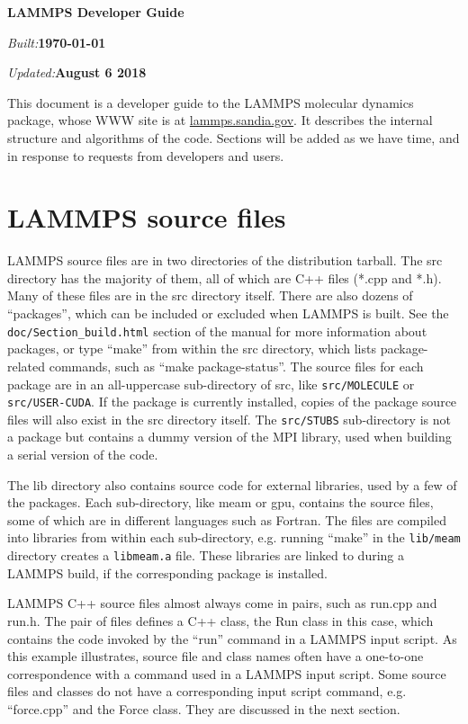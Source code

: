 \documentclass{article}
\newcommand{\path}[1]{{\color{gray}\texttt{#1}}}
\begin{document}
\centerline{\Large \bf LAMMPS Developer Guide}
\centerline{\emph{Built:}\bf \today}
\centerline{\emph{Updated:}\bf August 6 2018}

\vspace{0.5in}

This document is a developer guide to the LAMMPS molecular dynamics
package, whose WWW site is at \url{lammps.sandia.gov}.  It describes the
internal structure and algorithms of the code.  Sections will be added
as we have time, and in response to requests from developers and
users.

\tableofcontents
\renewcommand\listoflistingscaption{List of source codes}
\listoflistings

\pagebreak
\section{LAMMPS source files}

LAMMPS source files are in two directories of the distribution
tarball.  The src directory has the majority of them, all of which are
C++ files (*.cpp and *.h).  Many of these files are in the src
directory itself.  There are also dozens of ``packages'', which can be
included or excluded when LAMMPS is built.  See the
\path{doc/Section\_build.html} section of the manual for more information
about packages, or type ``make'' from within the src directory, which
lists package-related commands, such as ``make package-status''.  The
source files for each package are in an all-uppercase sub-directory of
src, like \path{src/MOLECULE} or \path{src/USER-CUDA}. If the package is currently
installed, copies of the package source files will also exist in the
src directory itself.  The \path{src/STUBS} sub-directory is not a package
but contains a dummy version of the MPI library, used when building a
serial version of the code.

The lib directory also contains source code for external libraries,
used by a few of the packages.  Each sub-directory, like meam or gpu,
contains the source files, some of which are in different languages
such as Fortran.  The files are compiled into libraries from within
each sub-directory, e.g. running ``make'' in the \path{lib/meam} directory
creates a \path{libmeam.a} file.  These libraries are linked to during a
LAMMPS build, if the corresponding package is installed.

LAMMPS C++ source files almost always come in pairs, such as run.cpp
and run.h.  The pair of files defines a C++ class, the Run class in
this case, which contains the code invoked by the ``run'' command in a
LAMMPS input script.  As this example illustrates, source file and
class names often have a one-to-one correspondence with a command used
in a LAMMPS input script.  Some source files and classes do not have a
corresponding input script command, e.g. ``force.cpp'' and the Force
class.  They are discussed in the next section.
\end{document}
